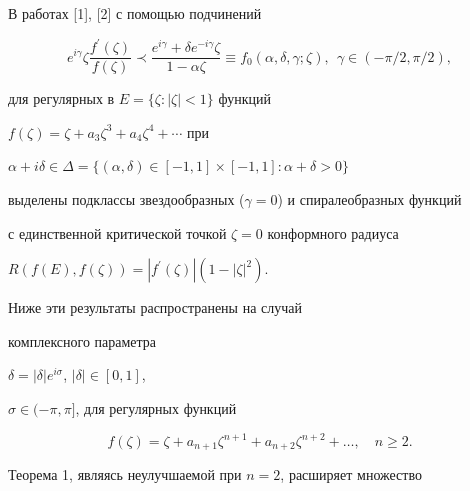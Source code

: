 \maketitle


\label{begin}








\setcounter{section}{0}








В работах [1], [2] с помощью подчинений


\begin{equation}


e^{i\gamma}\zeta\frac{f^\prime(\zeta)}{f(\zeta)}\prec\frac


{e^{i\gamma}+\delta e^{-i\gamma}\zeta}{1-\alpha\zeta}


\equiv f_0(\alpha,\delta,\gamma;\zeta),\ \ \gamma\in


(-\pi/2, \pi/ 2),


\end{equation}


для регулярных в $E=\{\zeta: |\zeta|<1\}$ функций


$f(\zeta)=\zeta+a_3 \zeta^3+a_4\zeta^4+ \dotsb$ при


$\alpha+i\delta\in\Delta=\{(\alpha,\delta)\in[-1,1]\times[-1,1]


: \alpha +\delta>0\}$


выделены подклассы звездообразных ($\gamma=0$) и спиралеобразных функций 


с единственной критической точкой $\zeta=0$ конформного радиуса


$R(f(E),f(\zeta))=|f^\prime(\zeta)|(1-|\zeta|^2)$.


Ниже эти результаты распространены на случай


комплексного параметра


$\delta=| \delta | e^{i\sigma}$, $| \delta | \in [0,1]$,


$\sigma \in ( -\pi,\pi]$, для регулярных функций


\begin{equation}


f(\zeta)=\zeta+a_{n+1}\zeta^{n+1}+a_{n+2}\zeta^{n+2}+\dots,\quad n\geq 2.


\end{equation}


Теорема 1, являясь неулучшаемой при $n=2$, расширяет множество 


